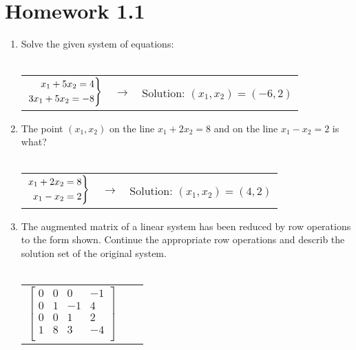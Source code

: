 \documentclass{article}
\newenvironment{rcases}
  {\left.\begin{aligned}}
  {\end{aligned}\right\rbrace}
\begin{document}
\section*{Homework 1.1}

\begin{enumerate}

    \item Solve the given system of equations: \\  \\
    \begin{tabular}{c c c}

        $\begin{rcases}
        x_1 + 5x_2 = 4 \\  
        3x_1 + 5x_2 = -8 \\ 
        \end{rcases}$

        & $\rightarrow$ &  

        Solution: $(x_1, x_2) = (-6, 2)$

    \end{tabular}

    \item The point $(x_1, x_2)$ on the line $x_1 + 2x_2 = 8$ and on the line $x_1 - x_2 = 2$ is what?\\  \\
    \begin{tabular}{c c c}

        $\begin{rcases}
        x_1 + 2x_2 = 8 \\  
        x_1 - x_2 = 2 \\ 
        \end{rcases}$

        & $\rightarrow$ &  

        Solution: $(x_1, x_2) = (4, 2)$

    \end{tabular}

    \item The augmented matrix of a linear system has been reduced by row operations to the form shown. Continue the appropriate row operations and describ the solution set of the original system.\\ \\
    \begin{tabular}{c c c}

        $\begin{bmatrix}
        0 & 0 & 0 & -1 \\ 
        0 & 1 & -1 & 4 \\
        0 & 0 & 1 & 2 \\
        1 & 8 & 3 & -4 \\
        \end{bmatrix}$


\end{tabular}
\end{enumerate}
\end{document}
